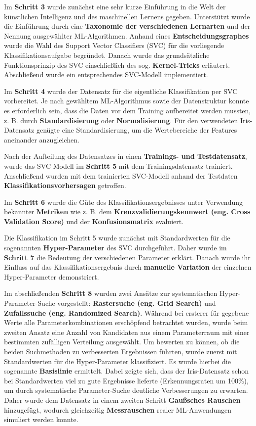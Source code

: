 \documentclass [oneside,10pt,a4paper,ngerman,BCOR10mm,headsepline,parindent,final]{scrartcl}
\begin{document}
Im \textbf{Schritt 3} wurde zunächst eine sehr kurze Einführung in die
Welt der künstlichen Intelligenz und des maschinellen Lernens gegeben.
Unterstützt wurde die Einführung durch eine \textbf{Taxonomie der
verschiedenen Lernarten} und der Nennung ausgewählter ML-Algorithmen.
Anhand eines \textbf{Entscheidungsgraphes} wurde die Wahl des Support
Vector Classifiers (SVC) für die vorliegende Klassifikationsaufgabe
begründet. Danach wurde das grundsätzliche Funktionsprinzip des SVC
einschließlich des sog. \textbf{Kernel-Tricks} erläutert. Abschließend
wurde ein entsprechendes SVC-Modell implementiert.

Im \textbf{Schritt 4} wurde der Datensatz für die eigentliche
Klassifikation per SVC vorbereitet. Je nach gewähltem ML-Algorithmus
sowie der Datenstruktur konnte es erforderlich sein, dass die Daten vor
dem Training aufbereitet werden mussten, z. B. durch
\textbf{Standardisierung} oder \textbf{Normalisierung}. Für den
verwendeten Iris-Datensatz genügte eine Standardisierung, um die
Wertebereiche der Features aneinander anzugleichen.

Nach der Aufteilung des Datensatzes in einen \textbf{Trainings- und
Testdatensatz}, wurde das SVC-Modell im \textbf{Schritt 5} mit dem
Trainingsdatensatz trainiert. Anschließend wurden mit dem trainierten
SVC-Modell anhand der Testdaten \textbf{Klassifikationsvorhersagen}
getroffen.

Im \textbf{Schritt 6} wurde die Güte des Klassifikationsergebnisses
unter Verwendung bekannter \textbf{Metriken} wie z. B. dem
\textbf{Kreuzvalidierungskennwert (eng. Cross Validation Score)} und der
\textbf{Konfusionsmatrix} evaluiert.

Die Klassifikation im Schritt 5 wurde zunächst mit Standardwerten für
die sogenannten \textbf{Hyper-Parameter} des SVC durchgeführt. Daher
wurde im \textbf{Schritt 7} die Bedeutung der verschiedenen Parameter
erklärt. Danach wurde ihr Einfluss auf das Klassifikationsergebnis durch
\textbf{manuelle Variation} der einzelnen Hyper-Parameter demonstriert.

Im abschließenden \textbf{Schritt 8} wurden zwei Ansätze zur
systematischen Hyper-Parameter-Suche vorgestellt: \textbf{Rastersuche
(eng. Grid Search)} und \textbf{Zufallssuche (eng. Randomized Search)}.
Während bei ersterer für gegebene Werte alle Parameterkombinationen
erschöpfend betrachtet wurden, wurde beim zweiten Ansatz eine Anzahl von
Kandidaten aus einem Parameterraum mit einer bestimmten zufälligen
Verteilung ausgewählt. Um bewerten zu können, ob die beiden Suchmethoden
zu verbesserten Ergebnissen führten, wurde zuerst mit Standardwerten für
die Hyper-Parameter klassifiziert. Es wurde hierbei die sogenannte
\textbf{Basislinie} ermittelt. Dabei zeigte sich, dass der
Iris-Datensatz schon bei Standardwerten viel zu gute Ergebnisse lieferte
(Erkennungsraten um 100\%), um durch systematische Parameter-Suche
deutliche Verbesserungen zu erwarten. Daher wurde dem Datensatz in einem
zweiten Schritt \textbf{Gaußsches Rauschen} hinzugefügt, wodurch
gleichzeitig \textbf{Messrauschen} realer ML-Anwendungen simuliert
werden konnte.
\end{document}

